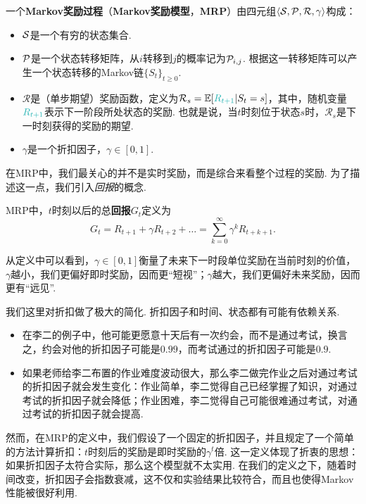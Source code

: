 \begin{definition}
一个\textbf{Markov奖励过程}（\textbf{Markov奖励模型}，\textbf{MRP}）由四元组$\langle\mathcal S,\mathcal P,\mathcal R,\gamma\rangle$构成：
\begin{itemize}
    \item $\mathcal S$是一个有穷的状态集合.
    \item $\mathcal P$是一个状态转移矩阵，从$i$转移到$j$的概率记为$\mathcal P_{i,j}$. 根据这一转移矩阵可以产生一个状态转移的Markov链$\{S_t\}_{t\geq 0}$.
    \item $\mathcal R$是（单步期望）奖励函数，定义为$\mathcal R_s = \E[\contrastlight{R_{t+1}}|S_t=s]$，其中，随机变量$\contrastlight{R_{t+1}}$表示下一阶段所处状态的奖励. 也就是说，当$t$时刻位于状态$s$时，$\mathcal R_s$是下一时刻获得的奖励的期望.
    \item $\gamma$是一个折扣因子，$\gamma\in[0,1]$.
\end{itemize}
\end{definition}

在MRP中，我们最关心的并不是实时奖励，而是综合来看整个过程的奖励. 为了描述这一点，我们引入\textit{回报}的概念.

\begin{definition}[回报]
MRP中，$t$时刻以后的总\textbf{回报}$G_t$定义为
    \[G_t = R_{t+1}+\gamma R_{t+2} +\dots =\sum_{k=0}^\infty \gamma^kR_{t+k+1}.\]    
\end{definition}
从定义中可以看到，$\gamma \in[0,1]$衡量了未来下一时段单位奖励在当前时刻的价值，$\gamma$越小，我们更偏好即时奖励，因而更“短视”；$\gamma$越大，我们更偏好未来奖励，因而更有“远见”.

我们这里对折扣做了极大的简化. 折扣因子和时间、状态都有可能有依赖关系. 
\begin{itemize}
    \item 在李二的例子中，他可能更愿意十天后有一次约会，而不是通过考试，换言之，约会对他的折扣因子可能是$0.99$，而考试通过的折扣因子可能是$0.9$.
    \item 如果老师给李二布置的作业难度波动很大，那么李二做完作业之后对通过考试的折扣因子就会发生变化：作业简单，李二觉得自己已经掌握了知识，对通过考试的折扣因子就会降低；作业困难，李二觉得自己可能很难通过考试，对通过考试的折扣因子就会提高.
\end{itemize}
然而，在MRP的定义中，我们假设了一个固定的折扣因子，并且规定了一个简单的方法计算折扣：$t$时刻后的奖励是即时奖励的$\gamma^t$倍. 这一定义体现了折衷的思想：如果折扣因子太符合实际，那么这个模型就不太实用. 在我们的定义之下，随着时间改变，折扣因子会指数衰减，这不仅和实验结果比较符合，而且也使得Markov性能被很好利用.


